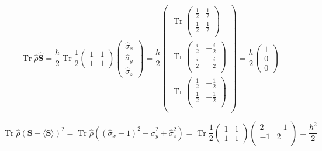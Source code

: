 \begin{solution}
	 $$
	 \operatorname{Tr}\hat{\rho}\hat{\boldsymbol{S}} = \frac{\hbar}{2} \operatorname{Tr}\frac{1}{2}\left(\begin{array}{ll}{1} & {1} \\ {1} & {1}\end{array}\right)
	 \left(\begin{array}{c}{\hat{\sigma}_{x}} \\ {\hat{\sigma}_{y}} \\ {\hat{\sigma}_{z}}\end{array}\right)=\frac{\hbar}{2}
	  \left(\begin{array}{c}\operatorname{Tr}\left(\begin{array}{cc}\frac{1}{2} & \frac{1}{2} \\
	 \frac{1}{2} & \frac{1}{2} \\ \end{array}\right) \\ \operatorname{Tr} \left(\begin{array}{cc}
	\frac{i}{2} & -\frac{i}{2} \\ \frac{i}{2} & -\frac{i}{2} \\ \end{array} \right) \\
	\operatorname{Tr} \left(\begin{array}{cc} \frac{1}{2} & -\frac{1}{2} \\ \frac{1}{2} & -\frac{1}{2} \\	\end{array} \right) \\ \end{array} \right) = \frac{\hbar}{2} \left(\begin{array}{l}{1} \\ {0} \\ {0}\end{array}\right)
	  $$
	  
	  
	  $$
	  \operatorname{Tr} \hat{\rho} \left(\boldsymbol{S}-\langle\boldsymbol{S}\rangle\right)^{2} = \operatorname{Tr} \hat{\rho} \left(\left(\hat{\sigma}_{x}-1\right)^{2}+\hat{\sigma}_{y}^{2}+\hat{\sigma}_{z}^{2}\right) = \operatorname{Tr} \frac{1}{2}\left(\begin{array}{ll}{1} & {1} \\ {1} & {1}\end{array}\right) \left(\begin{array}{cc} 2 & -1 \\ -1 & 2 \\\end{array}\right) = \frac{\hbar^2}{2}
	  $$
	 
	 
\end{solution}



